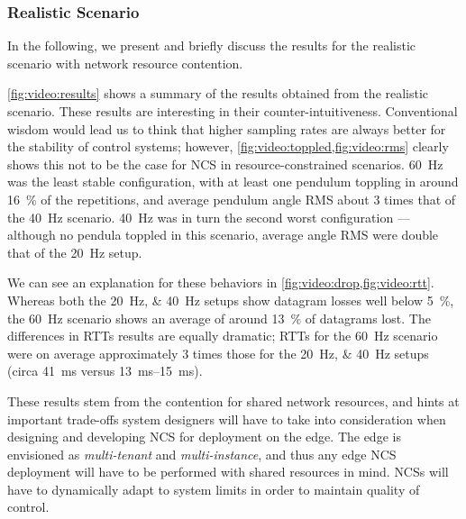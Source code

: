 \subsubsection{Realistic Scenario}

In the following, we present and briefly discuss the results for the realistic scenario with network resource contention.

\cref{fig:video:results} shows a summary of the results obtained from the realistic scenario.
These results are interesting in their counter-intuitiveness.
Conventional wisdom would lead us to think that higher sampling rates are always better for the stability of control systems; however, \cref{fig:video:toppled,fig:video:rms} clearly shows this not to be the case for \ac{NCS} in resource-constrained scenarios.
\SI{60}{\hertz} was the least stable configuration, with at least one pendulum toppling in around \SI{16}{\percent} of the repetitions, and average pendulum angle \ac{RMS} about \num{3} times that of the \SI{40}{\hertz} scenario.
\SI{40}{\hertz} was in turn the second worst configuration --- although no pendula toppled in this scenario, average angle \ac{RMS} were double that of the \SI{20}{\hertz} setup.

We can see an explanation for these behaviors in \cref{fig:video:drop,fig:video:rtt}.
Whereas both the \SIlist{20;40}{\hertz} setups show datagram losses well below \SI{5}{\percent}, the \SI{60}{\hertz} scenario shows an average of around \SI{13}{\percent} of datagrams lost.
The differences in \acp{RTT} results are equally dramatic; \acp{RTT} for the \SI{60}{\hertz} scenario were on average approximately \num{3} times those for the \SIlist{20;40}{\hertz} setups (circa \SI{41}{\milli\second} versus \SIrange[range-phrase=--]{13}{15}{\milli\second}).

These results stem from the contention for shared network resources, and hints at important trade-offs system designers will have to take into consideration when designing and developing \acl{NCS} for deployment on the edge.
The edge is envisioned as \emph{multi-tenant} and \emph{multi-instance}, and thus any edge \ac{NCS} deployment will have to be performed with shared resources in mind.
\acp{NCS} will have to dynamically adapt to system limits in order to maintain quality of control.
